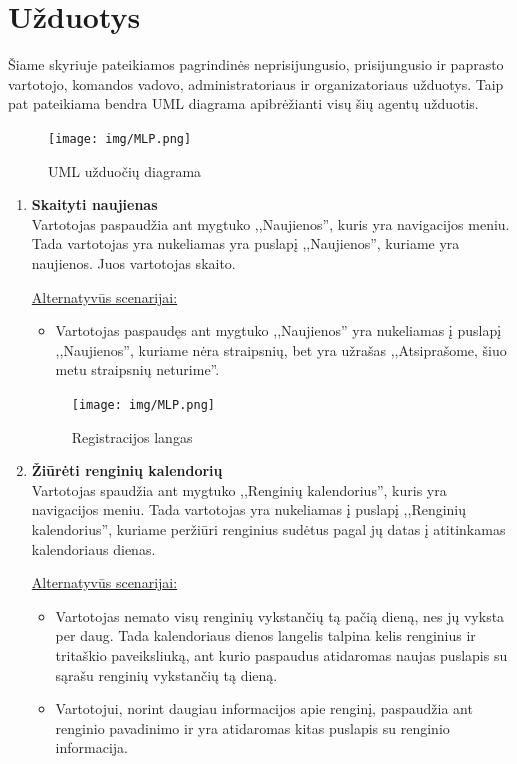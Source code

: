 \documentclass{VUMIFPSkursinis}
\begin{document}
    \section{Užduotys}\label{uzduotys}
		Šiame skyriuje pateikiamos pagrindinės neprisijungusio, prisijungusio ir paprasto vartotojo, komandos vadovo, administratoriaus ir organizatoriaus užduotys.
		Taip pat pateikiama bendra UML diagrama apibrėžianti visų šių agentų užduotis.
			\noindent
			
			\begin{figure}[H]
                \centering
                \texttt{[image: img/MLP.png]}
                \caption{UML užduočių diagrama}
                \label{fig:uzduociu-diagrama}
            \end{figure}

		\begin{enumerate} [label = \textbf{U\arabic*.}]
			\item \textbf{Skaityti naujienas} \\
				Vartotojas paspaudžia ant mygtuko ,,Naujienos'', kuris yra navigacijos meniu. Tada vartotojas yra nukeliamas yra puslapį ,,Naujienos'', kuriame yra naujienos. Juos vartotojas skaito.
				
				\underline{Alternatyvūs scenarijai:}
				\begin{itemize}
					\item Vartotojas paspaudęs ant mygtuko ,,Naujienos'' yra nukeliamas į puslapį ,,Naujienos'', kuriame nėra straipsnių, bet yra užrašas ,,Atsiprašome, šiuo metu straipsnių neturime''. 
				\end{itemize}

				\begin{figure}[H]
					\centering
					\texttt{[image: img/MLP.png]}
					\caption{Registracijos langas}
					\label{fig:uzd_registracija}
				\end{figure}
				
			\item \textbf{Žiūrėti renginių kalendorių} \\
				Vartotojas spaudžia ant mygtuko ,,Renginių kalendorius'', kuris yra navigacijos meniu. Tada vartotojas yra nukeliamas į puslapį ,,Renginių kalendorius'', kuriame peržiūri renginius sudėtus pagal jų datas į atitinkamas kalendoriaus dienas.
				
				\underline{Alternatyvūs scenarijai:}
				\begin{itemize}
					\item Vartotojas nemato visų renginių vykstančių tą pačią dieną, nes jų vyksta per daug. Tada kalendoriaus dienos langelis talpina kelis renginius ir tritaškio paveiksliuką, ant kurio paspaudus atidaromas naujas puslapis su sąrašu renginių vykstančių tą dieną.
					\item Vartotojui, norint daugiau informacijos apie renginį, paspaudžia ant renginio pavadinimo ir yra atidaromas kitas puslapis su renginio informacija.
				\end{itemize}
				

\end{enumerate}
\end{document}
